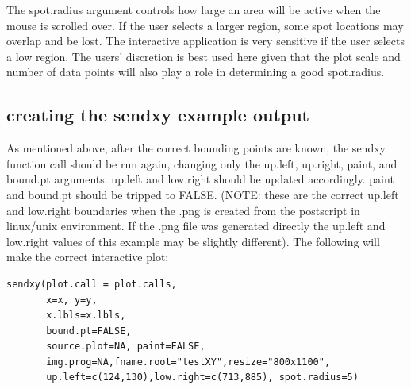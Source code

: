 \documentclass[]{article}
\begin{document}
\indent The spot.radius argument controls how large an area will be active when the mouse is scrolled over. If the user selects a larger region, some spot locations may overlap and be lost. The interactive application is very sensitive if the user selects a low region. The users' discretion is best used here given that the plot scale and number of data points will also play a role in determining a good spot.radius.  \\

\subsection{creating the sendxy example output}

\indent As mentioned above, after the correct bounding points are known, the sendxy function call should be run again, changing only the up.left, up.right, paint, and bound.pt arguments. up.left and low.right should be updated accordingly. paint and bound.pt should be tripped to FALSE. (NOTE: these are the correct up.left and low.right boundaries when the .png is created from the postscript in linux/unix environment. If the .png file was generated directly the up.left and low.right values of this example may be slightly different).  The following will make the correct interactive plot:
\begin{verbatim}
sendxy(plot.call = plot.calls, 
       x=x, y=y,
       x.lbls=x.lbls,  
       bound.pt=FALSE, 
       source.plot=NA, paint=FALSE,
       img.prog=NA,fname.root="testXY",resize="800x1100", 
       up.left=c(124,130),low.right=c(713,885), spot.radius=5)
\end{verbatim}
\end{document}

